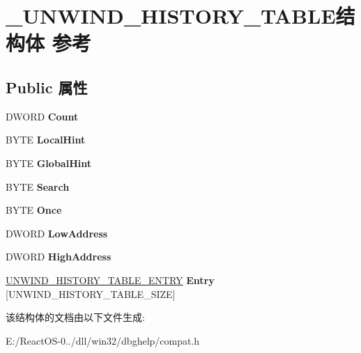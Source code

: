 \hypertarget{struct___u_n_w_i_n_d___h_i_s_t_o_r_y___t_a_b_l_e}{}\section{\+\_\+\+U\+N\+W\+I\+N\+D\+\_\+\+H\+I\+S\+T\+O\+R\+Y\+\_\+\+T\+A\+B\+L\+E结构体 参考}
\label{struct___u_n_w_i_n_d___h_i_s_t_o_r_y___t_a_b_l_e}
\subsection*{Public 属性}
\begin{DoxyCompactItemize}
\item 
\mbox{\label{struct___u_n_w_i_n_d___h_i_s_t_o_r_y___t_a_b_l_e_a1c0065b430f2078e774630b337272eaf}} 
D\+W\+O\+RD {\bfseries Count}
\item 
\mbox{\label{struct___u_n_w_i_n_d___h_i_s_t_o_r_y___t_a_b_l_e_adba3e9ba7ef8a7019a0c7ca743a46467}} 
B\+Y\+TE {\bfseries Local\+Hint}
\item 
\mbox{\label{struct___u_n_w_i_n_d___h_i_s_t_o_r_y___t_a_b_l_e_a5d05954a9146dd6ee9a60d2e67c94ee4}} 
B\+Y\+TE {\bfseries Global\+Hint}
\item 
\mbox{\label{struct___u_n_w_i_n_d___h_i_s_t_o_r_y___t_a_b_l_e_a763861e5b53a587f8d1b5bef8b23f459}} 
B\+Y\+TE {\bfseries Search}
\item 
\mbox{\label{struct___u_n_w_i_n_d___h_i_s_t_o_r_y___t_a_b_l_e_ac9ea37b2ff6320b7c027d34312b5150f}} 
B\+Y\+TE {\bfseries Once}
\item 
\mbox{\label{struct___u_n_w_i_n_d___h_i_s_t_o_r_y___t_a_b_l_e_aea3afdee3725a5a266ba79fbd85037e6}} 
D\+W\+O\+RD {\bfseries Low\+Address}
\item 
\mbox{\label{struct___u_n_w_i_n_d___h_i_s_t_o_r_y___t_a_b_l_e_a58464eac67b6860a717c42f3ee6b444b}} 
D\+W\+O\+RD {\bfseries High\+Address}
\item 
\mbox{\label{struct___u_n_w_i_n_d___h_i_s_t_o_r_y___t_a_b_l_e_a501ef6396b1f8d599c935b57925b3005}} 
\hyperlink{struct___u_n_w_i_n_d___h_i_s_t_o_r_y___t_a_b_l_e___e_n_t_r_y}{U\+N\+W\+I\+N\+D\+\_\+\+H\+I\+S\+T\+O\+R\+Y\+\_\+\+T\+A\+B\+L\+E\+\_\+\+E\+N\+T\+RY} {\bfseries Entry} \mbox{[}U\+N\+W\+I\+N\+D\+\_\+\+H\+I\+S\+T\+O\+R\+Y\+\_\+\+T\+A\+B\+L\+E\+\_\+\+S\+I\+ZE\mbox{]}
\end{DoxyCompactItemize}


该结构体的文档由以下文件生成\+:\begin{DoxyCompactItemize}
\item 
E\+:/\+React\+O\+S-\/0../dll/win32/dbghelp/compat.\+h\end{DoxyCompactItemize}
